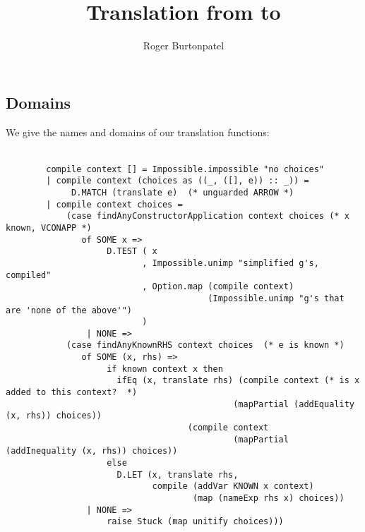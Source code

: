\documentclass[]{article}
\title{Translation from {\VMinus} to {\D}}
\author{Roger Burtonpatel}
\begin{document}
\maketitle

\subsection{Domains}
We give the names and domains of our translation functions: 

\begin{align*}
    \end{align*}

    \begin{verbatim}
        compile context [] = Impossible.impossible "no choices"
        | compile context (choices as ((_, ([], e)) :: _)) =
             D.MATCH (translate e)  (* unguarded ARROW *)
        | compile context choices =
            (case findAnyConstructorApplication context choices (* x known, VCONAPP *)
               of SOME x =>
                    D.TEST ( x
                           , Impossible.unimp "simplified g's, compiled"
                           , Option.map (compile context)
                                        (Impossible.unimp "g's that are 'none of the above'")
                           )
                | NONE =>
            (case findAnyKnownRHS context choices  (* e is known *)
               of SOME (x, rhs) =>
                    if known context x then
                      ifEq (x, translate rhs) (compile context (* is x added to this context?  *)
                                             (mapPartial (addEquality   (x, rhs)) choices))
                                    (compile context
                                             (mapPartial (addInequality (x, rhs)) choices))
                    else
                      D.LET (x, translate rhs,
                             compile (addVar KNOWN x context)
                                     (map (nameExp rhs x) choices))
                | NONE =>
                    raise Stuck (map unitify choices)))
    \end{verbatim}
\end{document}
